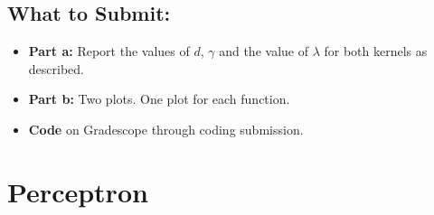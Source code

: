 \documentclass{article}
\begin{document}
\begin{aprob}
    \subsection*{What to Submit:}
    \begin{itemize}
        \item \textbf{Part a:} Report the values of $d$, $\gamma$ and the value of $\lambda$ for both kernels as described.
        \item \textbf{Part b:} Two plots. One plot for each function.
        \item \textbf{Code} on Gradescope through coding submission.
    \end{itemize}
\end{aprob}


\section*{Perceptron}
\end{document}
